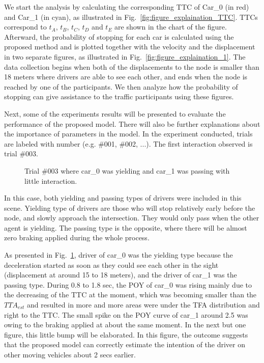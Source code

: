 We start the analysis by calculating the corresponding TTC of Car\_0 (in red) and Car\_1 (in cyan), as illustrated in Fig.~\ref{fig:figure_explaination_TTC}. TTCs correspond to $t_A$, $t_B$, $t_C$, $t_D$ and $t_E$ are shown in the chart of the figure. Afterward, the probability of stopping for each car is calculated using the proposed method and is plotted together with the velocity and the displacement in two separate figures, as illustrated in Fig.~\ref{fig:figure_explaination_1}. The data collection begins when both of the displacements to the node is smaller than 18 meters where drivers are able to see each other, and ends when the node is reached by one of the participants. We then analyze how the probability of stopping can give assistance to the traffic participants using these figures.


Next, some of the experiments results will be presented to evaluate the performance of the proposed model. There will also be further explanations about the importance of parameters in the model. In the experiment conducted, trials are labeled with number (e.g. \#001, \#002, ...). The first interaction observed is trial \#003. 

\begin{figure}[htbp!]
\begin{center}
\end{center}
\caption{Trial \#003 where car\_0 was yielding and car\_1 was passing with little interaction.}
\label{fig:trial003} 
\end{figure}

In this case, both yielding and passing types of drivers were included in this scene. Yielding type of drivers are those who will stop relatively early before the node, and slowly approach the intersection. They would only pass when the other agent is yielding. The passing type is the opposite, where there will be almost zero braking applied during the whole process. 


As presented in Fig.~\ref{fig:trial003}, driver of car\_0 was the yielding type because the deceleration started as soon as they could see each other in the sight (displacement at around 15 to 18 meters), and the driver of car\_1 was the passing type. During 0.8 to 1.8 sec, the POY of car\_0 was rising mainly due to the decreasing of the TTC at the moment, which was becoming smaller than the $TTA_{est}$ and resulted in more and more areas were under the TFA distribution and right to the TTC. The small spike on the POY curve of car\_1 around 2.5 was owing to the braking applied at about the same moment. In the next but one figure, this little bump will be elaborated. In this figure, the outcome suggests that the proposed model can correctly estimate the intention of the driver on other moving vehicles about 2 secs earlier.


